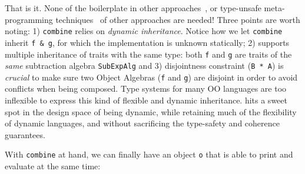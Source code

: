 That is it. None of the boilerplate in other approaches~\cite{oliveira2012extensibility}, or type-unsafe
meta-programming techniques~\cite{oliveira2013feature,rendel14attributes} of other approaches are needed! Three points are
worth noting: 1) \lstinline{combine} relies on \textit{dynamic inheritance}.
Notice how we let \lstinline{combine} inherit \lstinline{f & g}, for which the
implementation is unknown statically; 2) \name supports multiple inheritance of
traits with the same type: both \lstinline{f} and \lstinline{g} are traits of
the \emph{same} subtraction algebra \lstinline{SubExpAlg} and 3) disjointness
constraint (\lstinline{B * A}) is \textit{crucial} to make sure two Object
Algebras (\lstinline{f} and \lstinline{g}) are disjoint in order to avoid
conflicts when being composed. Type systems for many OO languages are too
inflexible to express this kind of flexible and dynamic inheritance. \name hits
a sweet spot in the design space of being dynamic, while retaining much
of the flexibility of dynamic languages, and without sacrificing the type-safety and
coherence guarantees.

With \lstinline{combine} at hand, we can finally have an object \lstinline{o}
that is able to print and evaluate at the same time:



\begin{comment}
which is of type
\lstinline{Exp}, to \lstinline{sub}, which expects a value of type
\lstinline{ExtExp}. This works precisely because \lstinline{Exp} is a
\textit{subtype} of \lstinline{ExtExp}. An acute reader by now may find an issue
about code reuse, i.e., we cannot reuse constructors! For example, the following
is rejected:
Instead, \lstinline{e3} should be written as follow:
Although, admittedly, creating expressions like this is slightly more
cumbersome.
\end{comment}


